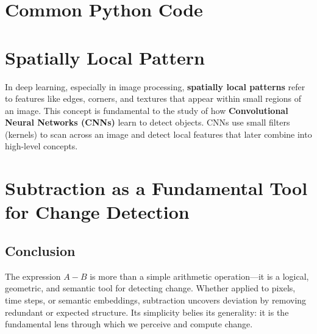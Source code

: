 \documentclass[grad]{ontariotechu-thesis}
\begin{document}


\chapter{Common Python Code}




\chapter{Spatially Local Pattern}
In deep learning, especially in image processing, \textbf{spatially local patterns} refer to features like edges, corners, and textures that appear within small regions of an image. This concept is fundamental to the study of how \textbf{Convolutional Neural Networks (CNNs)} learn to detect objects. CNNs use small filters (kernels) to scan across an image and detect local features that later combine into high-level concepts.
\chapter{Subtraction as a Fundamental Tool for Change Detection}







\section{Conclusion}
The expression $A - B$ is more than a simple arithmetic operation—it is a logical, geometric, and semantic tool for detecting change. Whether applied to pixels, time steps, or semantic embeddings, subtraction uncovers deviation by removing redundant or expected structure. Its simplicity belies its generality: it is the fundamental lens through which we perceive and compute change.

%

%
\end{document}
